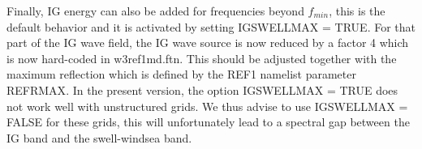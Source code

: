 Finally, IG energy can also be added for frequencies beyond $f_{min}$, this is the default behavior 
and it is activated by setting {\code IGSWELLMAX = TRUE}.  For that part of the IG wave
field, the IG wave source is now reduced by a factor 4 which is now hard-coded
in {\file w3ref1md.ftn}. This should be adjusted together with the maximum reflection 
which is defined by the {\F REF1} namelist parameter {\code
REFRMAX}. In the present version, the option {\code IGSWELLMAX = TRUE} does 
not work well with unstructured grids. We thus advise to use 
{\code IGSWELLMAX = FALSE} for these grids, this will unfortunately lead 
to a spectral gap between the IG band and the swell-windsea band. 




